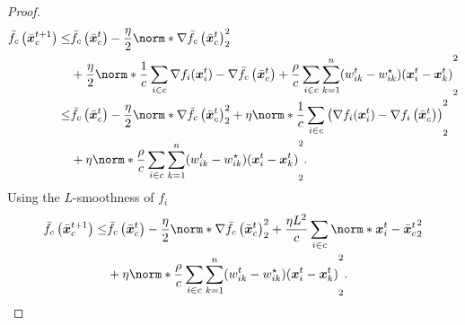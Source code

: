 \documentclass{article}
\begin{document}
\begin{proof}
\begin{align*}
    \bar{f}_c\left(\bar{\xx}_c^{t+1}\right)
    \le& \bar{f}_c\left(\bar{\xx}_c^{t}\right) 
    - \frac{\eta}{2} \norm*{\nabla \bar{f}_c\left(\bar{\xx}_c^{t}\right) }_2^2 \\
    &+ \frac{\eta}{2} \norm*{\frac{1}{c}\sum_{i\in c}\nabla f_i(\xx^t_i)
     - \nabla \bar{f}_c\left(\bar{\xx}_c^{t}\right) + \frac{\rho}{c}\sum_{i\in c} \sum_{k=1}^n (w^t_{ik}-w^{\star}_{ik})(\xx^t_i - \xx^t_k)}_2^2 \\
     \le& \bar{f}_c\left(\bar{\xx}_c^{t}\right) 
     - \frac{\eta}{2} \norm*{\nabla \bar{f}_c\left(\bar{\xx}_c^{t}\right) }_2^2
     + \eta \norm*{\frac{1}{c}\sum_{i\in c} \left(\nabla f_i(\xx^t_i) - \nabla f_i\left(\bar{\xx}_c^{t}\right)\right) }_2^2 \\
      & + \eta \norm*{\frac{\rho}{c}\sum_{i\in c} \sum_{k=1}^n (w^t_{ik}-w^{\star}_{ik})(\xx^t_i - \xx^t_k)}_2^2.
  \end{align*}
  Using the $L$-smoothness of $f_i$
  \begin{align*}
    \bar{f}_c\left(\bar{\xx}_c^{t+1}\right)
     \le& \bar{f}_c\left(\bar{\xx}_c^{t}\right) 
     - \frac{\eta}{2} \norm*{\nabla \bar{f}_c\left(\bar{\xx}_c^{t}\right) }_2^2
     +  \frac{\eta L^2}{c}\sum_{i\in c} \norm*{ \xx^t_i - \bar{\xx}_c^{t} }_2^2 \\
      & + \eta \norm*{\frac{\rho}{c}\sum_{i\in c} \sum_{k=1}^n (w^t_{ik}-w^{\star}_{ik})(\xx^t_i - \xx^t_k)}_2^2.
  \end{align*}
\end{proof}
\end{document}
